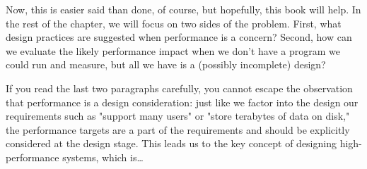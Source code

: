 Now, this is easier said than done, of course, but hopefully, this book will help. In the rest of the chapter, we will focus on two sides of the problem. First, what design practices are suggested when performance is a concern? Second, how can we evaluate the likely performance impact when we don't have a program we could run and measure, but all we have is a (possibly incomplete) design?

If you read the last two paragraphs carefully, you cannot escape the observation that performance is a design consideration: just like we factor into the design our requirements such as "support many users" or "store terabytes of data on disk," the performance targets are a part of the requirements and should be explicitly considered at the design stage. This leads us to the key concept of designing high-performance systems, which is…


































































